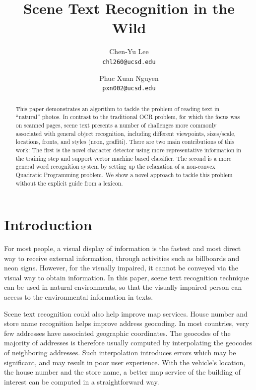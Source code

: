 \documentclass[10pt,twocolumn,letterpaper]{article}
\begin{document}
\title{Scene Text Recognition in the Wild}

\author{Chen-Yu Lee\\
{\tt\small chl260@ucsd.edu}
\and
Phuc Xuan Nguyen\\
{\tt\small pxn002@ucsd.edu}
}

\maketitle
\thispagestyle{empty}

\begin{abstract}
This paper demonstrates an algorithm to tackle the problem of reading text in ``natural'' photos. In contrast to the traditional OCR problem, for which the focus was on scanned pages, scene text presents a number of challenges more commonly associated with general object recognition, including different viewpoints, sizes/scale, locations, fronts, and styles (neon, graffiti). There are two main contributions of this work: The first is the novel character detector using more representative information in the training step and support vector machine based classifier. The second is a more general word recognition system by setting up the relaxation of a non-convex Quadratic Programming problem. We show a novel approach to tackle this problem without the explicit guide from a lexicon.
\end{abstract}

\section{Introduction}

For most people, a visual display of information is the fastest and most direct way to receive external information, through activities such as billboards and neon signs. However, for the visually impaired, it cannot be conveyed via the visual way to obtain information. In this paper, scene text recognition technique can be used in natural environments, so that the visually impaired person can access to the environmental information in texts.

Scene text recognition could also help improve map services. House number and store name recognition helps improve address geocoding. In most countries, very few addresses have associated geographic coordinates. The geocodes of the majority of addresses is therefore usually computed by interpolating the geocodes of neighboring addresses. Such interpolation introduces errors which may be significant, and may result in poor user experience. With the vehicle's location, the house number and the store name, a better map service of the building of interest can be computed in a straightforward way.
\end{document}
